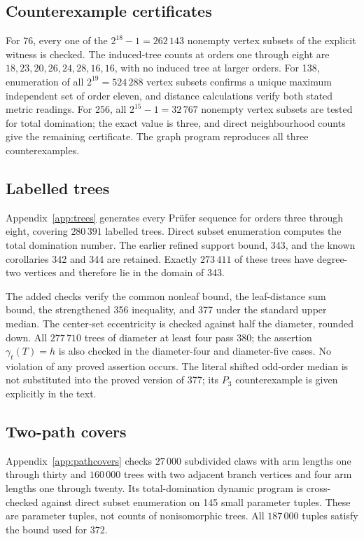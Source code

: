 \documentclass[11pt,a4paper]{article}
\theoremstyle{remark}
\begin{document}
\subsection{Counterexample certificates}
For 76, every one of the $2^{18}-1=262\,143$ nonempty vertex subsets of
the explicit witness is checked. The induced-tree counts at orders one
through eight are $18,23,20,26,24,28,16,16$, with no induced tree at larger
orders. For 138, enumeration of all $2^{19}=524\,288$ vertex subsets
confirms a unique maximum independent set of order eleven, and distance
calculations verify both stated metric readings. For 256, all
$2^{15}-1=32\,767$ nonempty vertex subsets are tested for total domination;
the exact value is three, and direct neighbourhood counts give the remaining
certificate. The graph program reproduces all three counterexamples.

\subsection{Labelled trees}
Appendix~\ref{app:trees} generates every Pr\"ufer sequence for orders
three through eight, covering $280\,391$ labelled trees. Direct subset
enumeration computes the total domination number. The earlier refined
support bound, 343, and the known corollaries 342 and 344 are retained.
Exactly $273\,411$ of these trees have degree-two vertices and therefore
lie in the domain of 343.

The added checks verify the common nonleaf bound, the leaf-distance sum
bound, the strengthened 356 inequality, and 377 under the standard upper
median. The center-set eccentricity is checked against half the diameter,
rounded down. All $277\,710$ trees of diameter at least four pass 380;
the assertion $\gamma_t(T)=h$ is also checked in the diameter-four and
diameter-five cases. No violation of any proved assertion occurs.
The literal shifted odd-order median is not substituted into the proved
version of 377; its $P_3$ counterexample is given explicitly in the text.

\subsection{Two-path covers}
Appendix~\ref{app:pathcovers} checks $27\,000$ subdivided claws with arm
lengths one through thirty and $160\,000$ trees with two adjacent branch
vertices and four arm lengths one through twenty. Its total-domination
dynamic program is cross-checked against direct subset enumeration on
145 small parameter tuples. These are parameter tuples, not counts of
nonisomorphic trees. All $187\,000$ tuples satisfy the bound used for 372.
\end{document}

